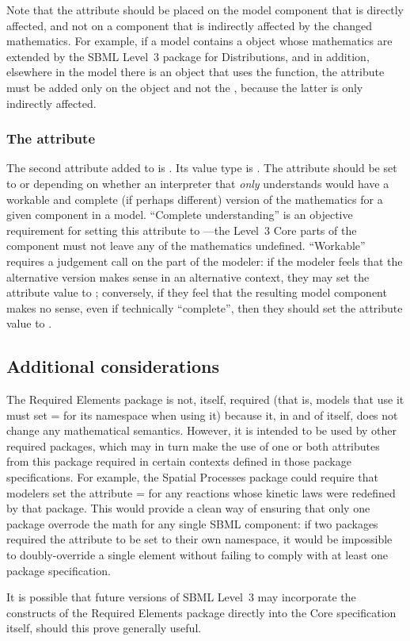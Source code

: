 Note that the  attribute should be placed on the model component that is directly affected, and not on a component that is indirectly affected by the changed mathematics.  For example, if a model contains a \FunctionDefinition object whose mathematics are extended by the SBML Level~3 package for Distributions, and in addition, elsewhere in the model there is an \InitialAssignment object that uses the function, the  attribute must be added only on the \FunctionDefinition object and not the \InitialAssignment, because the latter is only indirectly affected.


\subsubsection{The \fixttspace{} attribute}
\label{attribute-corehasalternativemath}

The second attribute added to \SBase is .  Its value type is .  The attribute should be set to  or  depending on whether an interpreter that \emph{only} understands \sbmlthreecore would have a workable and complete (if perhaps different) version of the mathematics for a given component in a model.  ``Complete understanding'' is an objective requirement for setting this attribute to ---the Level~3 Core parts of the component must not leave any of the mathematics undefined.  ``Workable'' requires a judgement call on the part of the modeler: if the modeler feels that the alternative version makes sense in an alternative context, they may set the attribute value to ; conversely, if they feel that the resulting model component makes no sense, even if technically ``complete'', then they should set the attribute value to .


\subsection{Additional considerations}

The Required Elements package is not, itself, required (that is, models that use it must set = for its namespace when using it) because it, in and of itself, does not change any mathematical semantics.  However, it is intended to be used by other required packages, which may in turn make the use of one or both attributes from this package required in certain contexts defined in those package specifications. For example, the Spatial Processes package could require that modelers set the attribute = for any reactions whose kinetic laws were redefined by that package. This would provide a clean way of ensuring that only one package overrode the math for any single SBML component: if two packages required the  attribute to be set to their own namespace, it would be impossible to doubly-override a single element without failing to comply with at least one package specification.

It is possible that future versions of SBML Level~3 may incorporate the constructs of the Required Elements package directly into the Core specification itself, should this prove generally useful.
